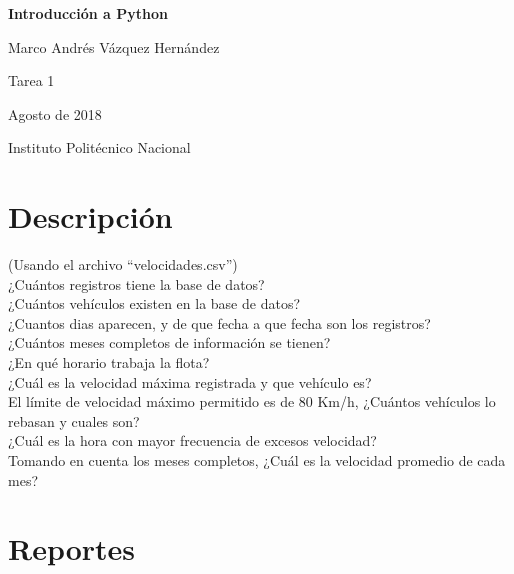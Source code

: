 \documentclass[]{article}
\title{}
\author{}
\date{}
\begin{document}
\begin{centering}

\vspace*{5 cm}

\Huge

{\bf Introducción a Python}

\vspace{3 cm}

\Large
Marco Andrés Vázquez Hernández

\vspace{1 cm}
\normalsize
Tarea 1 

Agosto de 2018

\normalsize
Instituto Politécnico Nacional


\end{centering}

\newpage

\section{Descripción}\label{descripcion}

(Usando el archivo ``velocidades.csv'')\\
¿Cuántos registros tiene la base de datos?\\
¿Cuántos vehículos existen en la base de datos?\\
¿Cuantos dias aparecen, y de que fecha a que fecha son los registros?\\
¿Cuántos meses completos de información se tienen?\\
¿En qué horario trabaja la flota?\\
¿Cuál es la velocidad máxima registrada y que vehículo es?\\
El límite de velocidad máximo permitido es de 80 Km/h, ¿Cuántos
vehículos lo rebasan y cuales son?\\
¿Cuál es la hora con mayor frecuencia de excesos velocidad?\\
Tomando en cuenta los meses completos, ¿Cuál es la velocidad promedio de
cada mes?

\section{Reportes}\label{reportes}
\end{document}

